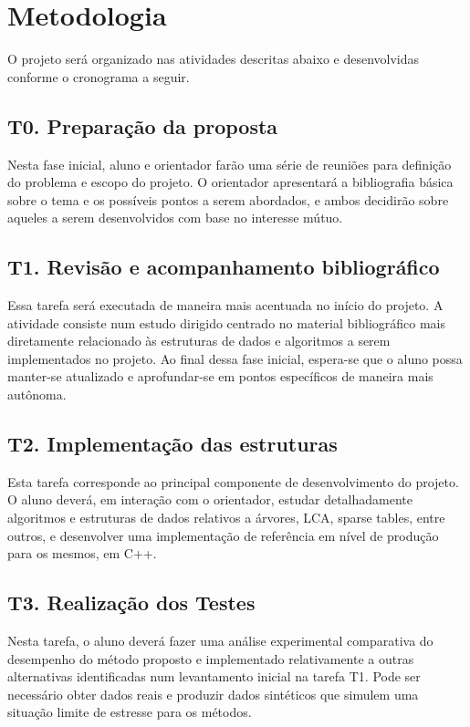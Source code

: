 \documentclass[12pt, a4paper, oneside]{article}
\begin{document}
\section*{Metodologia}

O projeto será organizado nas atividades descritas abaixo e desenvolvidas conforme o cronograma a seguir.

\subsection*{T0. Preparação da proposta}

Nesta fase inicial, aluno e orientador farão uma série de reuniões para definição do problema e escopo do projeto. O orientador apresentará a bibliografia básica sobre o tema e os possíveis pontos a serem abordados, e ambos decidirão sobre aqueles a serem desenvolvidos com base no  interesse mútuo.

\subsection*{T1. Revisão e acompanhamento bibliográfico}

Essa tarefa será executada de maneira mais acentuada no início do projeto. A atividade consiste num estudo dirigido centrado no  material bibliográfico mais diretamente relacionado às estruturas de dados e algoritmos a serem implementados no projeto. Ao final dessa fase inicial, espera-se que o aluno possa manter-se atualizado e aprofundar-se em pontos específicos de maneira mais autônoma.


\subsection*{T2. Implementação das estruturas}

Esta tarefa corresponde ao principal componente de desenvolvimento do projeto. O aluno deverá, em interação com o orientador, estudar detalhadamente algoritmos e estruturas de dados relativos a árvores, LCA, sparse tables, entre outros, e desenvolver uma implementação de referência em nível de produção para os mesmos, em C++.


\subsection*{T3. Realização dos Testes}

Nesta tarefa, o aluno deverá fazer uma análise experimental comparativa do desempenho do método proposto e implementado relativamente a outras alternativas identificadas num levantamento inicial na tarefa T1. Pode ser necessário obter dados reais e produzir dados sintéticos que simulem uma situação limite de estresse para os métodos.
\end{document}

